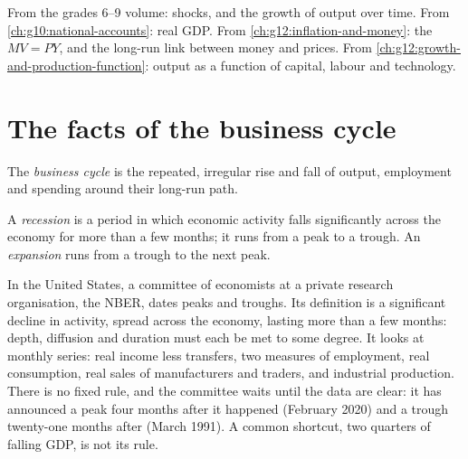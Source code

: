 \begin{recall}
From the grades 6--9 volume: shocks, and the growth of output over time. From \cref{ch:g10:national-accounts}: real GDP. From \cref{ch:g12:inflation-and-money}: the
 $MV = PY$, and the long-run link between money and prices. From \cref{ch:g12:growth-and-production-function}: output as a function of capital, labour
and technology.
\end{recall}

\section{The facts of the business cycle}\label{sec:g12:aggregate-demand-and-supply:facts}

\begin{definition}\label{def:g12:aggregate-demand-and-supply:business-cycle}
The \emph{business cycle} is the repeated, irregular rise and fall of output, employment and spending around their long-run path.
\end{definition}

\begin{definition}\label{def:g12:aggregate-demand-and-supply:recession}
A \emph{recession} is a period in which economic activity falls significantly across the economy for more than a few months; it runs from a peak to a
trough. An \emph{expansion}\label{def:g12:aggregate-demand-and-supply:expansion} runs from a trough to the next peak.
\end{definition}

\begin{measure}
In the United States, a committee of economists at a private research organisation, the NBER, dates peaks and troughs. Its definition is a significant decline in activity,
spread across the economy, lasting more than a few months: depth, diffusion and duration must each be met to some degree. It looks at monthly series: real income less
transfers, two measures of employment, real consumption, real sales of manufacturers and traders, and industrial production. There is no fixed rule, and the committee waits
until the data are clear: it has announced a peak four months after it happened (February 2020) and a trough twenty-one months after (March 1991). A common shortcut,
two quarters of falling GDP, is not its rule.
\end{measure}


